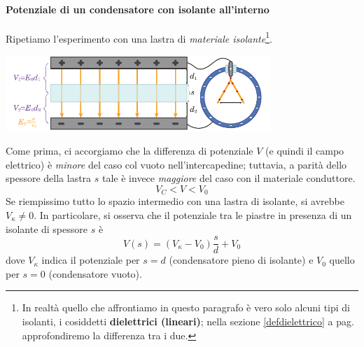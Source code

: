 \paragraph{Potenziale di un condensatore con isolante all'interno}
Ripetiamo l'esperimento con una lastra di \textit{materiale isolante}\footnote{In realtà quello che affrontiamo in questo paragrafo è vero solo alcuni tipi di isolanti, i cosiddetti \textbf{dielettrici (lineari)}; nella sezione \ref{defdielettrico} a pag. \pageref{defdielettrico} approfondiremo la differenza tra i due.}.
\begin{center}
	\includegraphics[width=0.75\textwidth]{images/chp6/chp6elettroscopio3.pdf}
\end{center}
Come prima, ci accorgiamo che la differenza di potenziale $V$ (e quindi il campo elettrico) è \textit{minore} del caso col vuoto nell'intercapedine; tuttavia, a parità dello spessore della lastra $s$ tale \ddp è invece \textit{maggiore} del caso con il materiale conduttore.
\begin{equation*}
	V_{C}<V<V_0
\end{equation*}
Se riempissimo tutto lo spazio intermedio con una lastra di isolante, si avrebbe $V_{\kappa}\neq0$. In particolare, si osserva che il potenziale tra le piastre in presenza di un isolante di spessore $s$ è
\begin{equation*}
	V(s)=\left(V_{\kappa}-V_0\right)\frac{s}{d}+V_0
\end{equation*} 
dove $V_{\kappa}$ indica il potenziale per $s=d$ (condensatore pieno di isolante) e $V_0$ quello per $s=0$  (condensatore vuoto).
